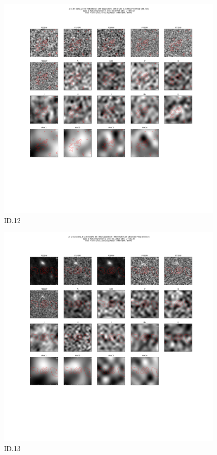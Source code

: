 \begin{figure}[tbp]
\centering \includegraphics[width=120mm]{Matched/ASPECS_Cutout_12.png}
\caption{ID.12}
\label{fig:Match_Three}
\end{figure}

\begin{figure}[tbp]
\centering \includegraphics[width=120mm]{Matched/ASPECS_Cutout_13.png}
\caption{ID.13}
\label{fig:Match_Three}
\end{figure}


